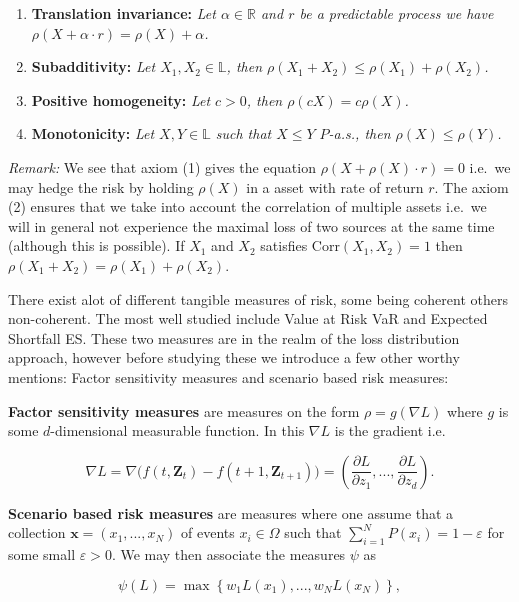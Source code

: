 \documentclass[a4paper,12pt,openany]{book}
\providecommand{\tightlist}{%
 \setlength{\itemsep}{0pt}\setlength{\parskip}{0pt}}
\begin{document}
\begin{enumerate}
\def\labelenumi{\arabic{enumi}.}
\tightlist
\item
  \textbf{Translation invariance:} \emph{Let \(\alpha\in\mathbb{R}\) and \(r\) be a predictable process we have \(\rho(X+\alpha\cdot r)=\rho(X)+\alpha\).}
\item
  \textbf{Subadditivity:} \emph{Let \(X_1,X_2\in\mathbb{L}\), then \(\rho(X_1+X_2)\le \rho(X_1)+\rho(X_2)\).}
\item
  \textbf{Positive homogeneity:} \emph{Let \(c>0\), then \(\rho(cX)=c\rho(X)\).}
\item
  \textbf{Monotonicity:} \emph{Let \(X,Y\in\mathbb{L}\) such that \(X\le Y\) \(P\)-a.s., then \(\rho(X)\le \rho(Y)\).}
\end{enumerate}

\emph{Remark:} We see that axiom (1) gives the equation \(\rho(X+\rho(X)\cdot r)=0\) i.e.~we may hedge the risk by holding \(\rho(X)\) in a asset with rate of return \(r\). The axiom (2) ensures that we take into account the correlation of multiple assets i.e.~we will in general not experience the maximal loss of two sources at the same time (although this is possible). If \(X_1\) and \(X_2\) satisfies \(\text{Corr}(X_1,X_2)=1\) then \(\rho(X_1+X_2)= \rho(X_1)+\rho(X_2)\).

There exist alot of different tangible measures of risk, some being coherent others non-coherent. The most well studied include Value at Risk VaR and Expected Shortfall ES. These two measures are in the realm of the loss distribution approach, however before studying these we introduce a few other worthy mentions: Factor sensitivity measures and scenario based risk measures:

\textbf{Factor sensitivity measures} are measures on the form \(\rho=g(\nabla L)\) where \(g\) is some \(d\)-dimensional measurable function. In this \(\nabla L\) is the gradient i.e.

\[
\nabla L=\nabla \Big(f(t,\mathbf{Z}_t)-f(t+1,\mathbf{Z}_{t+1})\Big)=\left(\frac{\partial L}{\partial z_1},...,\frac{\partial L}{\partial z_d}\right).
\]

\textbf{Scenario based risk measures} are measures where one assume that a collection \(\mathbf{x}=(x_1,...,x_N)\) of events \(x_i\in \Omega\) such that \(\sum_{i=1}^N P(x_i)=1-\varepsilon\) for some small \(\varepsilon>0\). We may then associate the measures \(\psi\) as

\[
\psi(L)=\max\left\{w_1L(x_1),...,w_NL(x_N)\right\},
\]
\end{document}
